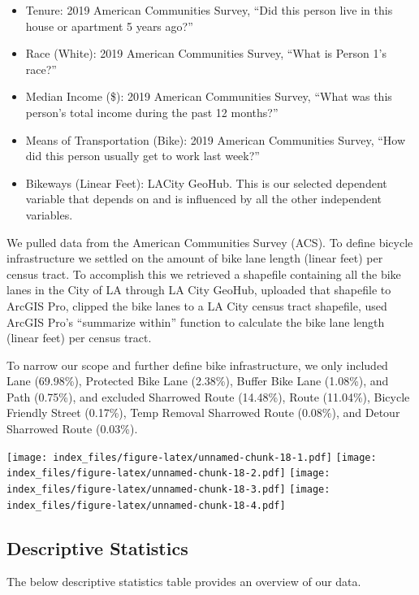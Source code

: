 \documentclass[
]{article}
\providecommand{\tightlist}{%
  \setlength{\itemsep}{0pt}\setlength{\parskip}{0pt}}
\begin{document}
\begin{itemize}
\tightlist
\item
  Tenure: 2019 American Communities Survey, ``Did this person live in
  this house or apartment 5 years ago?''
\item
  Race (White): 2019 American Communities Survey, ``What is Person 1's
  race?''
\item
  Median Income (\$): 2019 American Communities Survey, ``What was this
  person's total income during the past 12 months?''
\item
  Means of Transportation (Bike): 2019 American Communities Survey,
  ``How did this person usually get to work last week?''
\item
  Bikeways (Linear Feet): LACity GeoHub. This is our selected dependent
  variable that depends on and is influenced by all the other
  independent variables.
\end{itemize}

We pulled data from the American Communities Survey (ACS). To define
bicycle infrastructure we settled on the amount of bike lane length
(linear feet) per census tract. To accomplish this we retrieved a
shapefile containing all the bike lanes in the City of LA through LA
City GeoHub, uploaded that shapefile to ArcGIS Pro, clipped the bike
lanes to a LA City census tract shapefile, used ArcGIS Pro's ``summarize
within'' function to calculate the bike lane length (linear feet) per
census tract.

To narrow our scope and further define bike infrastructure, we only
included Lane (69.98\%), Protected Bike Lane (2.38\%), Buffer Bike Lane
(1.08\%), and Path (0.75\%), and excluded Sharrowed Route (14.48\%),
Route (11.04\%), Bicycle Friendly Street (0.17\%), Temp Removal
Sharrowed Route (0.08\%), and Detour Sharrowed Route (0.03\%).

\texttt{[image: index\_files/figure-latex/unnamed-chunk-18-1.pdf]}
\texttt{[image: index\_files/figure-latex/unnamed-chunk-18-2.pdf]}
\texttt{[image: index\_files/figure-latex/unnamed-chunk-18-3.pdf]}
\texttt{[image: index\_files/figure-latex/unnamed-chunk-18-4.pdf]}

\hypertarget{descriptive-statistics}{%
\subsection{Descriptive Statistics}\label{descriptive-statistics}}

The below descriptive statistics table provides an overview of our data.
\end{document}
